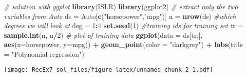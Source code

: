 \documentclass[]{article}
\newenvironment{Shaded}{\begin{snugshade}}{\end{snugshade}}
\newcommand{\KeywordTok}[1]{\textcolor[rgb]{0.13,0.29,0.53}{\textbf{#1}}}
\newcommand{\DataTypeTok}[1]{\textcolor[rgb]{0.13,0.29,0.53}{#1}}
\newcommand{\DecValTok}[1]{\textcolor[rgb]{0.00,0.00,0.81}{#1}}
\newcommand{\StringTok}[1]{\textcolor[rgb]{0.31,0.60,0.02}{#1}}
\newcommand{\CommentTok}[1]{\textcolor[rgb]{0.56,0.35,0.01}{\textit{#1}}}
\newcommand{\OperatorTok}[1]{\textcolor[rgb]{0.81,0.36,0.00}{\textbf{#1}}}
\newcommand{\NormalTok}[1]{#1}
\begin{document}
\begin{Shaded}
\begin{Highlighting}[]
\CommentTok{# solution with ggplot}
\KeywordTok{library}\NormalTok{(ISLR)}
\KeywordTok{library}\NormalTok{(ggplot2)}
\CommentTok{# extract only the two variables from Auto}
\NormalTok{ds =}\StringTok{ }\NormalTok{Auto[}\KeywordTok{c}\NormalTok{(}\StringTok{"horsepower"}\NormalTok{,}\StringTok{"mpg"}\NormalTok{)]}
\NormalTok{n =}\StringTok{ }\KeywordTok{nrow}\NormalTok{(ds)}
\CommentTok{#which degrees we will look at}
\NormalTok{deg =}\StringTok{ }\DecValTok{1}\OperatorTok{:}\DecValTok{4}
\KeywordTok{set.seed}\NormalTok{(}\DecValTok{1}\NormalTok{)}
\CommentTok{#training ids for training set}
\NormalTok{tr =}\StringTok{ }\KeywordTok{sample.int}\NormalTok{(n, n}\OperatorTok{/}\DecValTok{2}\NormalTok{)}
\CommentTok{# plot of training data}
\KeywordTok{ggplot}\NormalTok{(}\DataTypeTok{data =}\NormalTok{ ds[tr,], }\KeywordTok{aes}\NormalTok{(}\DataTypeTok{x=}\NormalTok{horsepower, }\DataTypeTok{y=}\NormalTok{mpg)) }\OperatorTok{+}\StringTok{ }\KeywordTok{geom_point}\NormalTok{(}\DataTypeTok{color =} \StringTok{"darkgrey"}\NormalTok{) }\OperatorTok{+}\StringTok{ }
\StringTok{  }\KeywordTok{labs}\NormalTok{(}\DataTypeTok{title =} \StringTok{"Polynomial regression"}\NormalTok{)}
\end{Highlighting}
\end{Shaded}

\texttt{[image: RecEx7-sol\_files/figure-latex/unnamed-chunk-2-1.pdf]}
\end{document}

